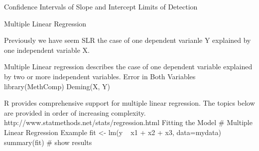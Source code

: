 Confidence Intervals of Slope and Intercept
Limits of Detection

Multiple Linear Regression

Previously we have seem SLR the case of one dependent varianle Y explained by one independent variable X.

Multiple Linear regression describes the case of one dependent variable explained by two or more independent variables. 
Error in Both Variables
library(MethComp)
Deming(X, Y)

R provides comprehensive support for multiple linear regression. The topics below are provided in order of increasing complexity.
http://www.statmethods.net/stats/regression.html
Fitting the Model
# Multiple Linear Regression Example 
fit <- lm(y ~ x1 + x2 + x3, data=mydata)
summary(fit) # show results

